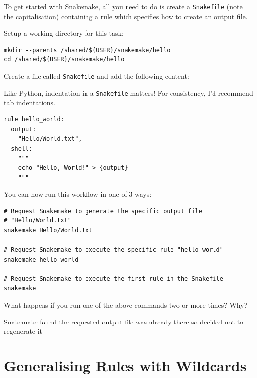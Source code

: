 To get started with Snakemake, all you need to do is create a \texttt{Snakefile} (note the capitalisation) containing a rule
which specifies how to create an output file.

Setup a working directory for this task:

\begin{lstlisting}
mkdir --parents /shared/${USER}/snakemake/hello
cd /shared/${USER}/snakemake/hello
\end{lstlisting}

Create a file called \texttt{Snakefile} and add the following content:

\begin{warning}

Like Python, indentation in a \texttt{Snakefile} matters! For consistency, I'd recommend tab indentations.

\end{warning}

\begin{lstlisting}
rule hello_world:
  output:
    "Hello/World.txt",
  shell:
    """
    echo "Hello, World!" > {output}
    """
\end{lstlisting}

You can now run this workflow in one of 3 ways:

\begin{lstlisting}
# Request Snakemake to generate the specific output file
# "Hello/World.txt"
snakemake Hello/World.txt

# Request Snakemake to execute the specific rule "hello_world"
snakemake hello_world

# Request Snakemake to execute the first rule in the Snakefile
snakemake
\end{lstlisting}

\begin{questions}

What happens if you run one of the above commands two or more times? Why?

\begin{answer}
Snakemake found the requested output file was already there so decided not to regenerate it.
\end{answer}

\end{questions}


\section{Generalising Rules with Wildcards}

